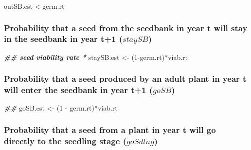\documentclass[
]{article}
\newenvironment{Shaded}{\begin{snugshade}}{\end{snugshade}}
\newcommand{\DecValTok}[1]{\textcolor[rgb]{0.00,0.00,0.81}{#1}}
\newcommand{\DocumentationTok}[1]{\textcolor[rgb]{0.56,0.35,0.01}{\textbf{\textit{#1}}}}
\newcommand{\NormalTok}[1]{#1}
\newcommand{\OtherTok}[1]{\textcolor[rgb]{0.56,0.35,0.01}{#1}}
\newcommand{\SpecialCharTok}[1]{\textcolor[rgb]{0.00,0.00,0.00}{#1}}
\begin{document}
\begin{Shaded}
\begin{Highlighting}[]
\NormalTok{outSB.est }\OtherTok{\textless{}{-}}\NormalTok{germ.rt}
\end{Highlighting}
\end{Shaded}

\hypertarget{probability-that-a-seed-from-the-seedbank-in-year-t-will-stay-in-the-seedbank-in-year-t1-staysb}{%
\subsubsection{\texorpdfstring{Probability that a seed from the seedbank
in year t will stay in the seedbank in year t+1
(\(staySB\))}{Probability that a seed from the seedbank in year t will stay in the seedbank in year t+1 (staySB)}}\label{probability-that-a-seed-from-the-seedbank-in-year-t-will-stay-in-the-seedbank-in-year-t1-staysb}}

\begin{Shaded}
\begin{Highlighting}[]
\DocumentationTok{\#\# seed viability rate * }
\NormalTok{staySB.est }\OtherTok{\textless{}{-}}\NormalTok{ (}\DecValTok{1}\SpecialCharTok{{-}}\NormalTok{germ.rt)}\SpecialCharTok{*}\NormalTok{viab.rt}
\end{Highlighting}
\end{Shaded}

\hypertarget{probability-that-a-seed-produced-by-an-adult-plant-in-year-t-will-enter-the-seedbank-in-year-t1-gosb}{%
\subsubsection{\texorpdfstring{Probability that a seed produced by an
adult plant in year t will enter the seedbank in year t+1
(\(goSB\))}{Probability that a seed produced by an adult plant in year t will enter the seedbank in year t+1 (goSB)}}\label{probability-that-a-seed-produced-by-an-adult-plant-in-year-t-will-enter-the-seedbank-in-year-t1-gosb}}

\begin{Shaded}
\begin{Highlighting}[]
\DocumentationTok{\#\# }
\NormalTok{goSB.est }\OtherTok{\textless{}{-}}\NormalTok{ (}\DecValTok{1} \SpecialCharTok{{-}}\NormalTok{ germ.rt)}\SpecialCharTok{*}\NormalTok{viab.rt}
\end{Highlighting}
\end{Shaded}

\hypertarget{probability-that-a-seed-from-a-plant-in-year-t-will-go-directly-to-the-seedling-stage-gosdlng}{%
\subsubsection{\texorpdfstring{Probability that a seed from a plant in
year t will go directly to the seedling stage
(\(goSdlng\))}{Probability that a seed from a plant in year t will go directly to the seedling stage (goSdlng)}}\label{probability-that-a-seed-from-a-plant-in-year-t-will-go-directly-to-the-seedling-stage-gosdlng}}
\end{document}
